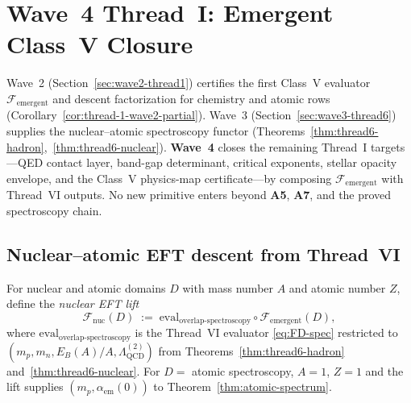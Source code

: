 \section{Wave~4 Thread~I: Emergent Class~V Closure}
\label{sec:wave4-thread1}

Wave~2 (Section~\ref{sec:wave2-thread1}) certifies the first Class~V evaluator
$\mathcal{F}_{\mathrm{emergent}}$ and descent factorization for chemistry and
atomic rows (Corollary~\ref{cor:thread-1-wave2-partial}). Wave~3
(Section~\ref{sec:wave3-thread6}) supplies the nuclear--atomic spectroscopy
functor (Theorems~\ref{thm:thread6-hadron},~\ref{thm:thread6-nuclear}).
\textbf{Wave~4} closes the remaining Thread~I targets---QED contact layer,
band-gap determinant, critical exponents, stellar opacity envelope, and the
Class~V physics-map certificate---by composing
$\mathcal{F}_{\mathrm{emergent}}$ with Thread~VI outputs. No new primitive
enters beyond \textbf{A5}, \textbf{A7}, and the proved spectroscopy chain.

\subsection{Nuclear--atomic EFT descent from Thread~VI}
\label{sec:wave4-thread1:nuclear}

\begin{definition}
\label{def:thread1-nuclear-eft}
For nuclear and atomic domains $D$ with mass number $A$ and atomic number $Z$,
define the \emph{nuclear EFT lift}
\begin{equation}\label{eq:thread1-nuclear-eft}
  \mathcal{F}_{\mathrm{nuc}}(D)
  \;:=\;
  \mathrm{eval}_{\mathrm{overlap\text{-}spectroscopy}}
  \circ
  \mathcal{F}_{\mathrm{emergent}}(D),
\end{equation}
where $\mathrm{eval}_{\mathrm{overlap\text{-}spectroscopy}}$ is the Thread~VI
evaluator \eqref{eq:FD-spec} restricted to
$(m_p,m_n,E_B(A)/A,\Lambda_{\mathrm{QCD}}^{(2)})$ from
Theorems~\ref{thm:thread6-hadron} and~\ref{thm:thread6-nuclear}.
For $D=$ atomic spectroscopy, $A=1$, $Z=1$ and the lift supplies
$(m_p,\alpha_{\mathrm{em}}(0))$ to Theorem~\ref{thm:atomic-spectrum}.
\end{definition}

